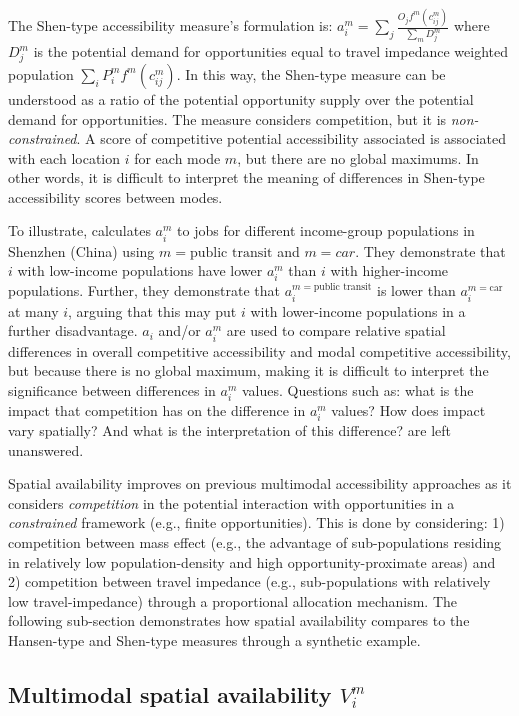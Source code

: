 \documentclass[]{trbunofficial}
\begin{document}
The Shen-type accessibility measure's formulation is:
\(a_i^m = \sum_j \frac{O_jf^m(c_{ij}^m)}{\sum_m D_j^m}\) where \(D_j^m\)
is the potential demand for opportunities equal to travel impedance
weighted population \(\sum_i P_i^m f^m(c_{ij}^m)\). In this way, the
Shen-type measure can be understood as a ratio of the potential
opportunity supply over the potential demand for opportunities. The
measure considers competition, but it is \emph{non-constrained}. A score
of competitive potential accessibility associated is associated with
each location \(i\) for each mode \(m\), but there are no global
maximums. In other words, it is difficult to interpret the meaning of
differences in Shen-type accessibility scores between modes.

To illustrate, \citet{taoInvestigatingImpactsPublic2020a} calculates
\(a_i^m\) to jobs for different income-group populations in Shenzhen
(China) using \(m = \text{public transit}\) and \(m={car}\). They
demonstrate that \(i\) with low-income populations have lower \(a_i^m\)
than \(i\) with higher-income populations. Further, they demonstrate
that \(a_i^{m=\text{public transit}}\) is lower than
\(a_i^{m=\text{car}}\) at many \(i\), arguing that this may put \(i\)
with lower-income populations in a further disadvantage. \(a_i\) and/or
\(a_i^m\) are used to compare relative spatial differences in overall
competitive accessibility and modal competitive accessibility, but
because there is no global maximum, making it is difficult to interpret
the significance between differences in \(a_i^{m}\) values. Questions
such as: what is the impact that competition has on the difference in
\(a_i^m\) values? How does impact vary spatially? And what is the
interpretation of this difference? are left unanswered.

Spatial availability improves on previous multimodal accessibility
approaches as it considers \emph{competition} in the potential
interaction with opportunities in a \emph{constrained} framework (e.g.,
finite opportunities). This is done by considering: 1) competition
between mass effect (e.g., the advantage of sub-populations residing in
relatively low population-density and high opportunity-proximate areas)
and 2) competition between travel impedance (e.g., sub-populations with
relatively low travel-impedance) through a proportional allocation
mechanism. The following sub-section demonstrates how spatial
availability compares to the Hansen-type and Shen-type measures through
a synthetic example.

\hypertarget{multimodal-spatial-availability-v_im}{%
\subsection{\texorpdfstring{Multimodal spatial availability
\(V_i^m\)}{Multimodal spatial availability V\_i\^{}m}}\label{multimodal-spatial-availability-v_im}}
\end{document}
